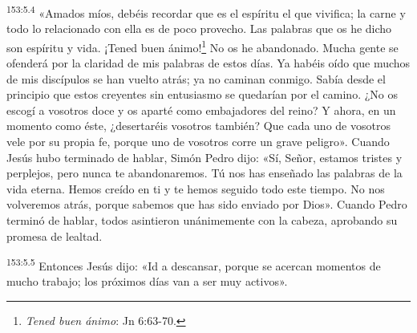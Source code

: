 \par 
\textsuperscript{153:5.4} «Amados míos, debéis recordar que es el espíritu el que vivifica; la carne y todo lo relacionado con ella es de poco provecho. Las palabras que os he dicho son espíritu y vida. ¡Tened buen ánimo!\footnote{\textit{Tened buen ánimo}: Jn 6:63-70.} No os he abandonado. Mucha gente se ofenderá por la claridad de mis palabras de estos días. Ya habéis oído que muchos de mis discípulos se han vuelto atrás; ya no caminan conmigo. Sabía desde el principio que estos creyentes sin entusiasmo se quedarían por el camino. ¿No os escogí a vosotros doce y os aparté como embajadores del reino? Y ahora, en un momento como éste, ¿desertaréis vosotros también? Que cada uno de vosotros vele por su propia fe, porque uno de vosotros corre un grave peligro». Cuando Jesús hubo terminado de hablar, Simón Pedro dijo: «Sí, Señor, estamos tristes y perplejos, pero nunca te abandonaremos. Tú nos has enseñado las palabras de la vida eterna. Hemos creído en ti y te hemos seguido todo este tiempo. No nos volveremos atrás, porque sabemos que has sido enviado por Dios». Cuando Pedro terminó de hablar, todos asintieron unánimemente con la cabeza, aprobando su promesa de lealtad.

\par 
\textsuperscript{153:5.5} Entonces Jesús dijo: «Id a descansar, porque se acercan momentos de mucho trabajo; los próximos días van a ser muy activos».